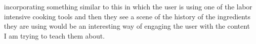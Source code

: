 \documentclass[12pt,twocolumn]{article}
\begin{document}
incorporating something similar to this in which the user is using one of the labor intensive cooking tools and then they see a scene of the history of the ingredients they are using would be an interesting way of engaging the user with the content I am trying to teach them about. 

\printbibliography 
\end{document}
